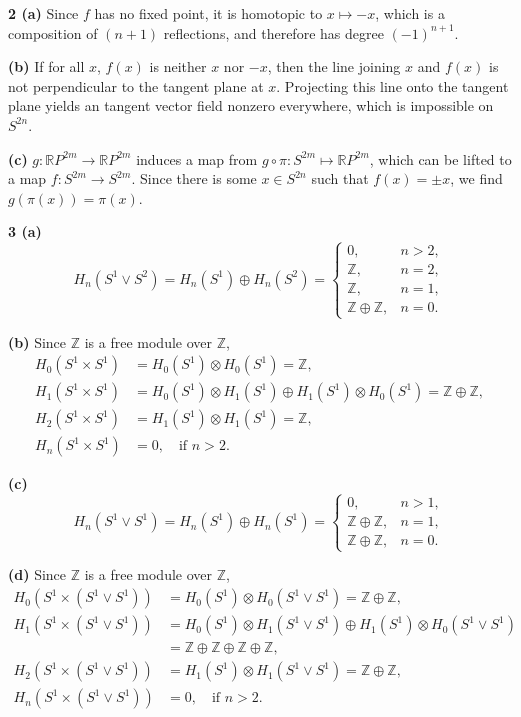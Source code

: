 \documentclass{article}
\makeatletter
\newcommand*{\shifttext}[1]{%
  \settowidth{\@tempdima}{#1}%
  \hspace{-\@tempdima}#1%
}
\newcommand{\plabel}[1]{%
\shifttext{\textbf{#1}\quad}%
}
\newcommand{\prule}{%
\begin{center}%
\hdashrule[0.5ex]{.99\linewidth}{1pt}{1pt 2.5pt}%
\end{center}%
}
\newcommand{\minusbaseline}{\abovedisplayskip=0pt\abovedisplayshortskip=0pt~\vspace*{-\baselineskip}}%
\makeatother
\begin{document}
\prule

\plabel{2 (a)}%
Since $f$ has no fixed point, it is homotopic to $x \mapsto -x$, which is a composition of $(n+1)$ reflections, and therefore has degree $(-1)^{n+1}$.

\plabel{(b)}%
If for all $x$, $f(x)$ is neither $x$ nor $-x$, then the line joining $x$ and $f(x)$ is not perpendicular to the tangent plane at $x$.
Projecting this line onto the tangent plane yields an tangent vector field nonzero everywhere, which is impossible on $S^{2n}$.

\plabel{(c)}%
$g:\mathbb{R}P^{2m} \rightarrow \mathbb{R}P^{2m}$ induces a map from $g\circ \pi: S^{2m} \mapsto \mathbb{R}P^{2m}$, which can be lifted to a map $f:S^{2m} \rightarrow S^{2m}$.
Since there is some $x\in S^{2n}$ such that $f(x) = \pm x$, we find $g(\pi(x)) = \pi(x)$.

\prule

\plabel{3 (a)}%
\begingroup\minusbaseline
\[ H_n(S^1 \vee S^2) = H_n(S^1) \oplus H_n(S^2) = \begin{cases}
    0, & n>2,\\
    \mathbb{Z},& n=2, \\
    \mathbb{Z},& n=1, \\
    \mathbb{Z}\oplus \mathbb{Z}, & n=0.
\end{cases} \]
\endgroup

\plabel{(b)}%
Since $\mathbb{Z}$ is a free module over $\mathbb{Z}$,
\begin{align*}
    H_0(S^1 \times {S}^1) &= H_0(S^1) \otimes H_0(S^1) = \mathbb{Z}, \\
    H_1(S^1 \times {S}^1) &= H_0(S^1) \otimes H_1(S^1) \oplus  H_1(S^1) \otimes H_0(S^1) = \mathbb{Z} \oplus \mathbb{Z}, \\
    H_2(S^1 \times {S}^1) &= H_1(S^1) \otimes H_1(S^1) = \mathbb{Z}, \\
    H_n(S^1 \times {S}^1) &= 0,\quad \text{if } n>2.
\end{align*}

\plabel{(c)}%
\begingroup\minusbaseline
\[ H_n(S^1 \vee S^1) = H_n(S^1) \oplus H_n(S^1) = \begin{cases}
    0, & n>1,\\
    \mathbb{Z}\oplus \mathbb{Z},& n=1, \\
    \mathbb{Z}\oplus \mathbb{Z}, & n=0.
\end{cases} \]
\endgroup

\plabel{(d)}%
Since $\mathbb{Z}$ is a free module over $\mathbb{Z}$,
\begin{align*}
    H_0(S^1 \times (S^1 \vee S^1)) &= H_0(S^1) \otimes H_0(S^1 \vee S^1) = \mathbb{Z} \oplus \mathbb{Z}, \\
    H_1(S^1 \times (S^1 \vee S^1)) &= H_0(S^1) \otimes H_1(S^1\vee S^1) \oplus  H_1(S^1) \otimes H_0(S^1\vee S^1) \\
    &= \mathbb{Z} \oplus \mathbb{Z} \oplus \mathbb{Z} \oplus \mathbb{Z}, \\
    H_2(S^1 \times (S^1 \vee S^1)) &= H_1(S^1) \otimes H_1(S^1\vee S^1) = \mathbb{Z} \oplus \mathbb{Z}, \\
    H_n(S^1 \times (S^1 \vee S^1)) &= 0,\quad \text{if } n>2.
\end{align*}
\end{document}
